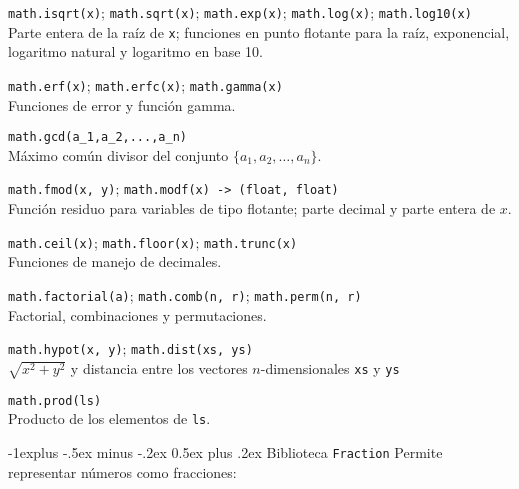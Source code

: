 \documentclass[10pt,landscape]{article}
\makeatletter
\renewcommand{\subsection}{\@startsection{subsection}{2}{0mm}%
                                {-1explus -.5ex minus -.2ex}%
                                {0.5ex plus .2ex}%
                                {\normalfont\normalsize\bfseries}}
\makeatother
\begin{document}
\begin{multicols}{3}
\begin{asparaitem}
\item \verb|math.isqrt(x)|; \verb|math.sqrt(x)|; \verb|math.exp(x)|; \verb|math.log(x)|; \verb|math.log10(x)| \\
\quad Parte entera de la raíz de \verb|x|; funciones en punto flotante para la raíz, exponencial, logaritmo natural y logaritmo en base 10.

    \item \verb|math.erf(x)|; \verb|math.erfc(x)|; \verb|math.gamma(x)| \\
\quad Funciones de error y función gamma.

  \item \verb|math.gcd(a_1,a_2,...,a_n)| \\
    \quad Máximo común divisor del conjunto $\{a_1,a_2,\dots,a_n\}$.

    \item \verb|math.fmod(x, y)|; \verb|math.modf(x) -> (float, float)| \\
\quad Función residuo para variables de tipo flotante; parte decimal y parte entera de $x$.

    \item \verb|math.ceil(x)|;
      \verb|math.floor(x)|;
      \verb|math.trunc(x)| \\
\quad Funciones de manejo de decimales.

    \item \verb|math.factorial(a)|; \verb|math.comb(n, r)|; \verb|math.perm(n, r)| \\
\quad Factorial, combinaciones y permutaciones.%

    \item \verb|math.hypot(x, y)|; \verb|math.dist(xs, ys)| \\
\quad $\sqrt{x^2+y^2}$ y distancia entre los vectores $n$-dimensionales  \verb|xs| y \verb|ys|

    \item \verb|math.prod(ls)| \\
\quad Producto de los elementos de \verb|ls|.
\end{asparaitem}

\subsection{Biblioteca \texttt{Fraction}}
Permite representar n\'umeros como fracciones:


\end{multicols}
\end{document}
